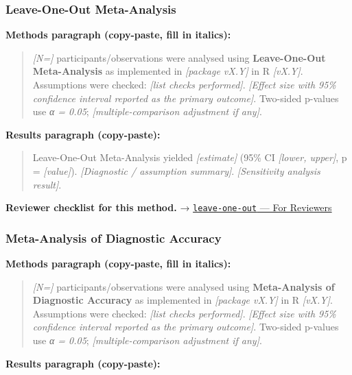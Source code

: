 \documentclass[
]{article}
\begin{document}
\subsubsection{Leave-One-Out
Meta-Analysis}\label{leave-one-out-meta-analysis}

\textbf{Methods paragraph (copy-paste, fill in italics):}

\begin{quote}
\emph{{[}N={]}} participants/observations were analysed using
\textbf{Leave-One-Out Meta-Analysis} as implemented in \emph{{[}package
vX.Y{]}} in R \emph{{[}vX.Y{]}}. Assumptions were checked: \emph{{[}list
checks performed{]}}. \emph{{[}Effect size with 95\% confidence interval
reported as the primary outcome{]}}. Two-sided p-values use \emph{α =
0.05}; \emph{{[}multiple-comparison adjustment if any{]}}.
\end{quote}

\textbf{Results paragraph (copy-paste):}

\begin{quote}
Leave-One-Out Meta-Analysis yielded \emph{{[}estimate{]}} (95\% CI
\emph{{[}lower, upper{]}}, p = \emph{{[}value{]}}). \emph{{[}Diagnostic
/ assumption summary{]}}. \emph{{[}Sensitivity analysis result{]}}.
\end{quote}

\textbf{Reviewer checklist for this method.} →
\href{../chapters/15-metaanalysis/leave-one-out.Rmd\#for-reviewers}{\texttt{leave-one-out}
--- For Reviewers}

\subsubsection{Meta-Analysis of Diagnostic
Accuracy}\label{meta-analysis-of-diagnostic-accuracy}

\textbf{Methods paragraph (copy-paste, fill in italics):}

\begin{quote}
\emph{{[}N={]}} participants/observations were analysed using
\textbf{Meta-Analysis of Diagnostic Accuracy} as implemented in
\emph{{[}package vX.Y{]}} in R \emph{{[}vX.Y{]}}. Assumptions were
checked: \emph{{[}list checks performed{]}}. \emph{{[}Effect size with
95\% confidence interval reported as the primary outcome{]}}. Two-sided
p-values use \emph{α = 0.05}; \emph{{[}multiple-comparison adjustment if
any{]}}.
\end{quote}

\textbf{Results paragraph (copy-paste):}
\end{document}
